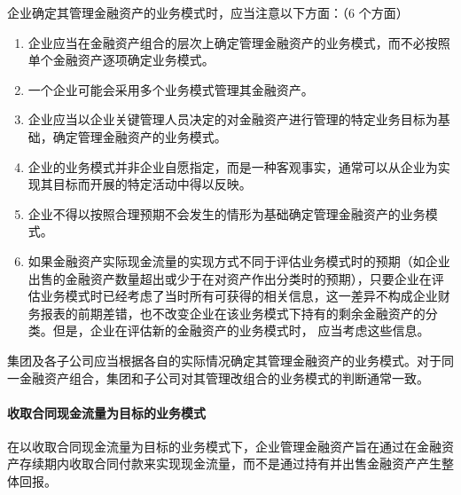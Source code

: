 \documentclass[UTF8,12pt]{ctexart}
\numberwithin{equation}{section} %
\numberwithin{figure}{section}
\numberwithin{table}{section}
\begin{document}
	企业确定其管理金融资产的业务模式时，应当注意以下方面：（6 个方面）
	\begin{enumerate}
		\item 企业应当在金融资产组合的层次上确定管理金融资产的业务模式，而不必按照单个金融资产逐项确定业务模式。
		
		\item 一个企业可能会采用多个业务模式管理其金融资产。
		
		\item 企业应当以企业关键管理人员决定的对金融资产进行管理的特定业务目标为基础，确定管理金融资产的业务模式。
		
		\item 企业的业务模式并非企业自愿指定，而是一种客观事实，通常可以从企业为实现其目标而开展的特定活动中得以反映。
		
		\item 企业不得以按照合理预期不会发生的情形为基础确定管理金融资产的业务模式。
		
		\item 如果金融资产实际现金流量的实现方式不同于评估业务模式时的预期（如企业出售的金融资产数量超出或少于在对资产作出分类时的预期），只要企业在评估业务模式时已经考虑了当时所有可获得的相关信息，这一差异不构成企业财务报表的前期差错，也不改变企业在该业务模式下持有的剩余金融资产的分类。但是，企业在评估新的金融资产的业务模式时， 应当考虑这些信息。
	\end{enumerate}

	集团及各子公司应当根据各自的实际情况确定其管理金融资产的业务模式。对于同一金融资产组合，集团和子公司对其管理改组合的业务模式的判断通常一致。
	
	\paragraph{收取合同现金流量为目标的业务模式}
	在以收取合同现金流量为目标的业务模式下，企业管理金融资产旨在通过在金融资产存续期内收取合同付款来实现现金流量，而不是通过持有并出售金融资产产生整体回报。
	
\end{document}
